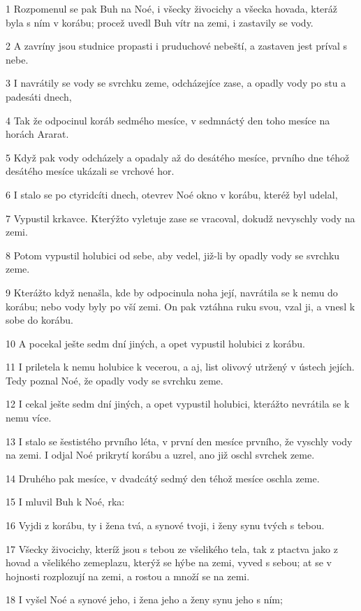 \par 1 Rozpomenul se pak Buh na Noé, i všecky živocichy a všecka hovada, kteráž byla s ním v korábu; procež uvedl Buh vítr na zemi, i zastavily se vody.
\par 2 A zavríny jsou studnice propasti i pruduchové nebeští, a zastaven jest príval s nebe.
\par 3 I navrátily se vody se svrchku zeme, odcházejíce zase, a opadly vody po stu a padesáti dnech,
\par 4 Tak že odpocinul koráb sedmého mesíce, v sedmnáctý den toho mesíce na horách Ararat.
\par 5 Když pak vody odcházely a opadaly až do desátého mesíce, prvního dne téhož desátého mesíce ukázali se vrchové hor.
\par 6 I stalo se po ctyridcíti dnech, otevrev Noé okno v korábu, kteréž byl udelal,
\par 7 Vypustil krkavce. Kterýžto vyletuje zase se vracoval, dokudž nevyschly vody na zemi.
\par 8 Potom vypustil holubici od sebe, aby vedel, již-li by opadly vody se svrchku zeme.
\par 9 Kterážto když nenašla, kde by odpocinula noha její, navrátila se k nemu do korábu; nebo vody byly po vší zemi. On pak vztáhna ruku svou, vzal ji, a vnesl k sobe do korábu.
\par 10 A pocekal ješte sedm dní jiných, a opet vypustil holubici z korábu.
\par 11 I priletela k nemu holubice k vecerou, a aj, list olivový utržený v ústech jejích. Tedy poznal Noé, že opadly vody se svrchku zeme.
\par 12 I cekal ješte sedm dní jiných, a opet vypustil holubici, kterážto nevrátila se k nemu více.
\par 13 I stalo se šestistého prvního léta, v první den mesíce prvního, že vyschly vody na zemi. I odjal Noé prikrytí korábu a uzrel, ano již oschl svrchek zeme.
\par 14 Druhého pak mesíce, v dvadcátý sedmý den téhož mesíce oschla zeme.
\par 15 I mluvil Buh k Noé, rka:
\par 16 Vyjdi z korábu, ty i žena tvá, a synové tvoji, i ženy synu tvých s tebou.
\par 17 Všecky živocichy, kteríž jsou s tebou ze všelikého tela, tak z ptactva jako z hovad a všelikého zemeplazu, kterýž se hýbe na zemi, vyved s sebou; at se v hojnosti rozplozují na zemi, a rostou a množí se na zemi.
\par 18 I vyšel Noé a synové jeho, i žena jeho a ženy synu jeho s ním;
